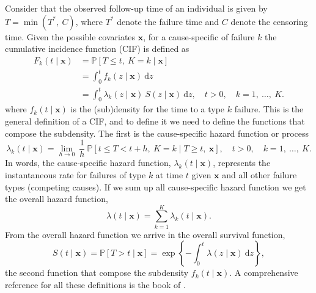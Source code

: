Consider that the observed follow-up time of an individual is given by
\(T = \min(T^{\ast},~C)\), where \(T^{\ast}\) denote the failure time
and \(C\) denote the censoring time. Given the possible covariates
\(\bm{x}\), for a cause-specific of failure \(k\) the cumulative
incidence function (CIF) is defined as
\begin{align*}
  F_{k}(t \mid \bm{x})
  &= \mathbb{P}[T \leq t,~K = k \mid \bm{x}]\\
  &= \int_{0}^{t} f_{k}(z \mid \bm{x})~\text{d}z\\
  &= \int_{0}^{t} \lambda_{k}(z \mid \bm{x})~S(z \mid \bm{x})
    ~\text{d}z, \quad t > 0, \quad k = 1,~\dots,~K.
\end{align*}
where \(f_{k}(t \mid \bm{x})\) is the (sub)density for the time to a
type \(k\) failure. This is the general definition of a CIF, and to
define it we need to define the functions that compose the subdensity.
The first is the cause-specific hazard function or process
\[
  \lambda_{k}(t \mid \bm{x}) =
  \lim_{h \rightarrow 0}~\frac{1}{h}~
  \mathbb{P}[t \leq T < t + h,~K = k \mid T \geq t,~\bm{x}],
  \quad t > 0, \quad k = 1,~\dots,~K.
\]
In words, the cause-specific hazard function, \(\lambda_{k}(t \mid
\bm{x})\), represents the instantaneous rate for failures of type
\(k\) at time \(t\) given \(\bm{x}\) and all other failure types
(competing causes). If we sum up all cause-specific hazard function we
get the overall hazard function,
\[
  \lambda(t \mid \bm{x}) =
  \sum_{k=1}^{K}\lambda_{k}(t \mid \bm{x}).
\]
From the overall hazard function we arrive in the overall survival
function,
\[
  S(t \mid \bm{x}) =
  \mathbb{P}[T > t \mid \bm{x}] =
  \exp\left\{-\int_{0}^{t} \lambda(z \mid \bm{x})~\text{d}z\right\},
\]
the second function that compose the subdensity \(f_{k}(t \mid
\bm{x})\). A comprehensive reference for all these definitions is
the book of .


